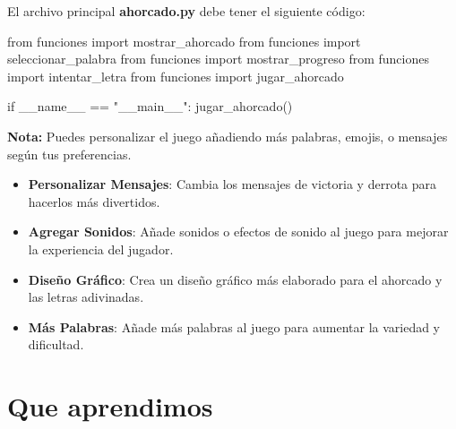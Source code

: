 \documentclass[
  a4paper,
  DIV=11,
  numbers=noendperiod,
  onepage,
  openany]{scrreprt}
\newenvironment{Shaded}{\begin{snugshade}}{\end{snugshade}}
\newcommand{\ControlFlowTok}[1]{\textcolor[rgb]{0.00,0.23,0.31}{#1}}
\newcommand{\ImportTok}[1]{\textcolor[rgb]{0.00,0.46,0.62}{#1}}
\newcommand{\NormalTok}[1]{\textcolor[rgb]{0.00,0.23,0.31}{#1}}
\newcommand{\OperatorTok}[1]{\textcolor[rgb]{0.37,0.37,0.37}{#1}}
\newcommand{\StringTok}[1]{\textcolor[rgb]{0.13,0.47,0.30}{#1}}
\newcommand{\VariableTok}[1]{\textcolor[rgb]{0.07,0.07,0.07}{#1}}
\begin{document}
El archivo principal \textbf{ahorcado.py} debe tener el siguiente
código:

\begin{Shaded}
\begin{Highlighting}[]
\ImportTok{from}\NormalTok{ funciones }\ImportTok{import}\NormalTok{ mostrar\_ahorcado}
\ImportTok{from}\NormalTok{ funciones }\ImportTok{import}\NormalTok{ seleccionar\_palabra}
\ImportTok{from}\NormalTok{ funciones }\ImportTok{import}\NormalTok{ mostrar\_progreso}
\ImportTok{from}\NormalTok{ funciones }\ImportTok{import}\NormalTok{ intentar\_letra}
\ImportTok{from}\NormalTok{ funciones }\ImportTok{import}\NormalTok{ jugar\_ahorcado}

\ControlFlowTok{if} \VariableTok{\_\_name\_\_} \OperatorTok{==} \StringTok{"\_\_main\_\_"}\NormalTok{:}
\NormalTok{    jugar\_ahorcado()}
\end{Highlighting}
\end{Shaded}

\begin{tcolorbox}[enhanced jigsaw, bottomrule=.15mm, rightrule=.15mm, colframe=quarto-callout-tip-color-frame, arc=.35mm, breakable, colbacktitle=quarto-callout-tip-color!10!white, toptitle=1mm, colback=white, opacitybacktitle=0.6, opacityback=0, bottomtitle=1mm, toprule=.15mm, titlerule=0mm, left=2mm, coltitle=black, leftrule=.75mm, title=\textcolor{quarto-callout-tip-color}{\faLightbulb}\hspace{0.5em}{Tip}]

\textbf{Nota:} Puedes personalizar el juego añadiendo más palabras,
emojis, o mensajes según tus preferencias.

\end{tcolorbox}

\begin{itemize}
\item
  \textbf{Personalizar Mensajes}: Cambia los mensajes de victoria y
  derrota para hacerlos más divertidos.
\item
  \textbf{Agregar Sonidos}: Añade sonidos o efectos de sonido al juego
  para mejorar la experiencia del jugador.
\item
  \textbf{Diseño Gráfico}: Crea un diseño gráfico más elaborado para el
  ahorcado y las letras adivinadas.
\item
  \textbf{Más Palabras}: Añade más palabras al juego para aumentar la
  variedad y dificultad.
\end{itemize}

\chapter{Que aprendimos}\label{que-aprendimos}
\end{document}
